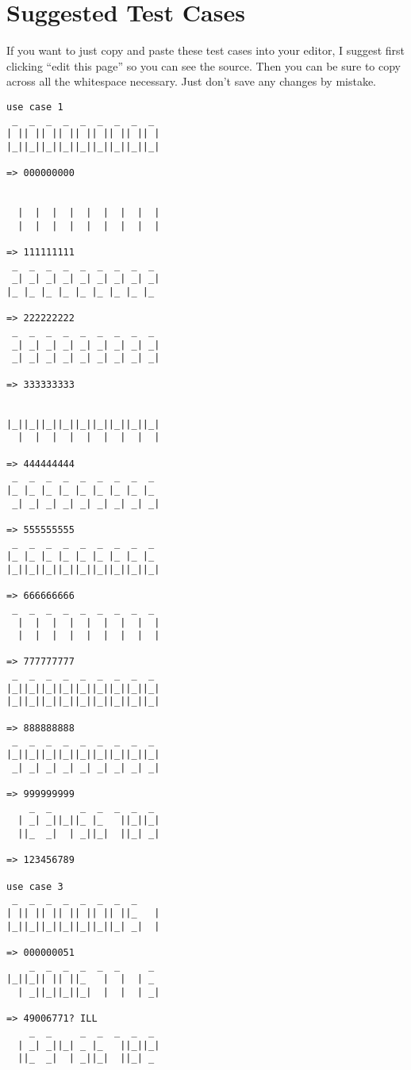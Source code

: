 \pagebreak
\section{Suggested Test Cases}

If you want to just copy and paste these test cases into your editor, I suggest first clicking “edit this page” so you can see the source. Then you can be sure to copy across all the whitespace necessary. Just don’t save any changes by mistake.

\begin{lstlisting}[numbers=none]
use case 1
 _  _  _  _  _  _  _  _  _ 
| || || || || || || || || |
|_||_||_||_||_||_||_||_||_|

=> 000000000


  |  |  |  |  |  |  |  |  |
  |  |  |  |  |  |  |  |  |

=> 111111111
 _  _  _  _  _  _  _  _  _ 
 _| _| _| _| _| _| _| _| _|
|_ |_ |_ |_ |_ |_ |_ |_ |_ 

=> 222222222
 _  _  _  _  _  _  _  _  _ 
 _| _| _| _| _| _| _| _| _|
 _| _| _| _| _| _| _| _| _|

=> 333333333


|_||_||_||_||_||_||_||_||_|
  |  |  |  |  |  |  |  |  |

=> 444444444
 _  _  _  _  _  _  _  _  _ 
|_ |_ |_ |_ |_ |_ |_ |_ |_ 
 _| _| _| _| _| _| _| _| _|

=> 555555555
 _  _  _  _  _  _  _  _  _ 
|_ |_ |_ |_ |_ |_ |_ |_ |_ 
|_||_||_||_||_||_||_||_||_|

=> 666666666
 _  _  _  _  _  _  _  _  _ 
  |  |  |  |  |  |  |  |  |
  |  |  |  |  |  |  |  |  |

=> 777777777
 _  _  _  _  _  _  _  _  _ 
|_||_||_||_||_||_||_||_||_|
|_||_||_||_||_||_||_||_||_|

=> 888888888
 _  _  _  _  _  _  _  _  _ 
|_||_||_||_||_||_||_||_||_|
 _| _| _| _| _| _| _| _| _|

=> 999999999
    _  _     _  _  _  _  _ 
  | _| _||_||_ |_   ||_||_|
  ||_  _|  | _||_|  ||_| _|

=> 123456789

use case 3
 _  _  _  _  _  _  _  _    
| || || || || || || ||_   |
|_||_||_||_||_||_||_| _|  |

=> 000000051
    _  _  _  _  _  _     _ 
|_||_|| || ||_   |  |  | _ 
  | _||_||_||_|  |  |  | _|

=> 49006771? ILL
    _  _     _  _  _  _  _ 
  | _| _||_| _ |_   ||_||_|
  ||_  _|  | _||_|  ||_| _ 


\end{lstlisting}
